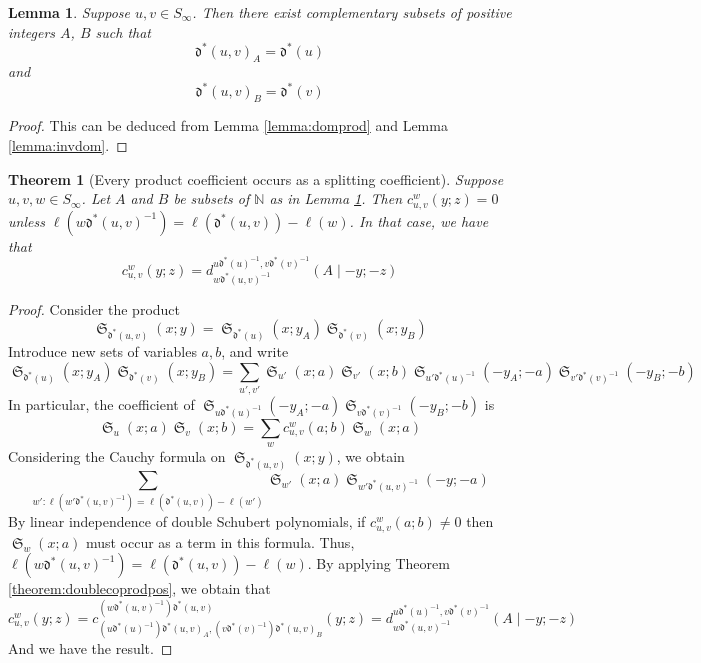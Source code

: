 \documentclass[reqno]{amsart}
\newtheorem{lemma}{Lemma}[subsection]
\newtheorem{theorem}{Theorem}[section]
\theoremstyle{definition}
\newtheorem{example}[lemma]{Example}
\theoremstyle{remark}
\numberwithin{equation}{subsection}
\DeclareMathOperator{\sch}{\mathfrak{S}}
\newcommand{\cpcf}[5]{d^{#1,#2}_{#3}\left(#4\mid #5\right)}
\newcommand{\dom}{\mathfrak{d}}
\newcommand{\ldom}{\dom^*}
\begin{document}
\begin{lemma} \label{lemma:cansplit}
Suppose $u,v\in S_\infty$. Then there exist complementary subsets of positive integers $A$, $B$ such that
$$\ldom(u,v)_A=\ldom(u)$$
and
$$\ldom(u,v)_B=\ldom(v)$$
\end{lemma}
\begin{proof}
This can be deduced from Lemma \ref{lemma:domprod} and Lemma \ref{lemma:invdom}. 
\end{proof}

\begin{theorem}[Every product coefficient occurs as a splitting coefficient] \label{theorem:allprod}
Suppose $u,v,w\in S_\infty$. Let $A$ and $B$ be subsets of $\mathbb{N}$ as in Lemma \ref{lemma:cansplit}. Then $c_{u,v}^w(y;z)=0$ unless $\ell(w\ldom(u,v)^{-1})=\ell(\ldom(u,v))-\ell(w)$. In that case, we have that 
$$c_{u,v}^w(y;z)=\cpcf{u\ldom(u)^{-1}}{v\ldom(v)^{-1}}{w\ldom(u,v)^{-1}}{A}{-y;-z}$$
\end{theorem}
\begin{proof}
Consider the product
$$\sch_{\ldom(u,v)}(x;y)=\sch_{\ldom(u)}(x;y_A)\sch_{\ldom(v)}(x;y_B)$$
Introduce new sets of variables $a,b$, and write
$$\sch_{\ldom(u)}(x;y_A)\sch_{\ldom(v)}(x;y_B)=\sum_{u',v'}\sch_{u'}(x;a)\sch_{v'}(x;b)\sch_{u'\ldom(u)^{-1}}(-y_A;-a)\sch_{v'\ldom(v)^{-1}}(-y_B;-b)$$
In particular, the coefficient of $\sch_{u\ldom(u)^{-1}}(-y_A;-a)\sch_{v\ldom(v)^{-1}}(-y_B;-b)$ is
$$\sch_u(x;a)\sch_v(x;b)=\sum_{w}c_{u,v}^w(a;b)\sch_w(x;a)$$
Considering the Cauchy formula on $\sch_{\ldom(u,v)}(x;y)$, we obtain
$$\sum_{w':\ell(w'\ldom(u,v)^{-1})=\ell(\ldom(u,v))-\ell(w')}\sch_{w'}(x;a)\sch_{w'\ldom(u,v)^{-1}}(-y;-a)$$
By linear independence of double Schubert polynomials, if $c_{u,v}^w(a;b)\neq 0$ then $\sch_w(x; a )$ must occur as a term in this formula. Thus, $\ell(w\ldom(u,v)^{-1})=\ell(\ldom(u,v))-\ell(w)$. By applying Theorem \ref{theorem:doublecoprodpos}, we obtain that 
$$c_{u,v}^w(y;z)=c_{(u\ldom(u)^{-1})\ldom(u,v)_A,(v\ldom(v)^{-1})\ldom(u,v)_B}^{(w\ldom(u,v)^{-1})\ldom(u,v)}(y;z)=\cpcf{u\ldom(u)^{-1}}{v\ldom(v)^{-1}}{w\ldom(u,v)^{-1}}{A}{-y;-z}$$
And we have the result.
\end{proof}

%
%
%
%
\end{document}
